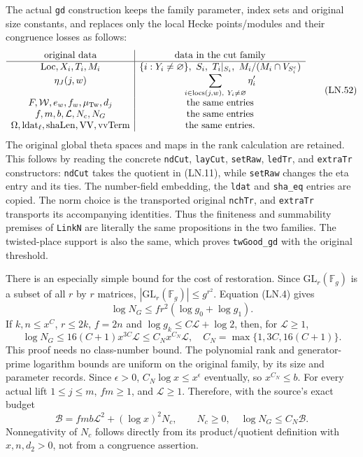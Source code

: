 The actual \texttt{gd} construction keeps the family parameter,
index sets and original size constants, and replaces only the
local Hecke points/modules and their congruence losses as follows:
\[
 \begin{array}{c|c}
 \text{original data}&\text{data in the cut family}\\ \hline
 \mathrm{Loc},X_i,T_i,M_i&
 \{i:Y_i\ne\varnothing\},\ S_i,\ T_i|_{S_i},\ M_i/(M_i\cap V_{S_i^c})\\
 \eta_J(j,w)&\displaystyle\sum_{i\in\operatorname{locs}(j,w),\ Y_i\ne\varnothing}
                                                   \eta'_i\\
 F,\mathcal W,e_w,f_w,\mu_{\rm Tw},d_j&\text{the same entries}\\
 f,m,b,\mathcal L,N_c,N_G&\text{the same entries}\\
 \Omega,\mathrm{ldat}_\ell,\mathrm{shaLen},\mathrm{VV},\mathrm{vvTerm}
                                      &\text{the same entries}.
 \end{array}                                                    \tag{LN.52}
\]
The original global theta spaces and maps in the rank calculation
are retained.  This follows by reading the concrete
\texttt{ndCut}, \texttt{layCut}, \texttt{setRaw}, \texttt{ledTr},
and \texttt{extraTr} constructors: \texttt{ndCut} takes the quotient
in (LN.11), while \texttt{setRaw} changes the eta entry and its ties.
The number-field embedding, the \texttt{ldat} and \texttt{sha\_eq}
entries are copied.  The norm choice is the transported original
\texttt{nchTr}, and \texttt{extraTr} transports its accompanying
identities.  Thus the finiteness and summability premises of
\texttt{LinkN} are literally the same propositions in the two
families.  The twisted-place support is also the same, which
proves \texttt{twGood\_gd} with the original threshold.

There is an especially simple bound for the cost of restoration.
Since $\mathrm{GL}_r(\mathbb F_g)$ is a subset of all $r$ by $r$
matrices, $|\mathrm{GL}_r(\mathbb F_g)|\le g^{r^2}$.
Equation (LN.4) gives
\[
       \log N_G\le fr^2(\log g_0+\log g_1).
 \tag{LN.53}
\]
If $k,n\le x^C$, $r\le2k$, $f=2n$ and
$\log g_k\le C\mathcal L+\log2$, then, for $\mathcal L\ge1$,
\[
 \log N_G\le16(C+1)x^{3C}\mathcal L
                     \le C_Nx^{C_N}\mathcal L,
 \quad C_N=\max\{1,3C,16(C+1)\}.
 \tag{LN.54}
\]
This proof needs no class-number bound.  The polynomial rank and
generator-prime logarithm bounds are uniform on the original
family, by its size and parameter records.  Since $\epsilon>0$,
$C_N\log x\le x^\epsilon$ eventually, so $x^{C_N}\le b$.
For every actual lift $1\le j\le m$, $fm\ge1$, and $\mathcal L\ge1$.
Therefore, with the source's exact budget
\[
 \mathcal B=fmb\mathcal L^2+(\log x)^2N_c,
          \qquad N_c\ge0,
 \quad \log N_G\le C_N\mathcal B.                    \tag{LN.55}
\]
Nonnegativity of $N_c$ follows directly from its product/quotient
definition with $x,n,d_2>0$, not from a congruence assertion.

